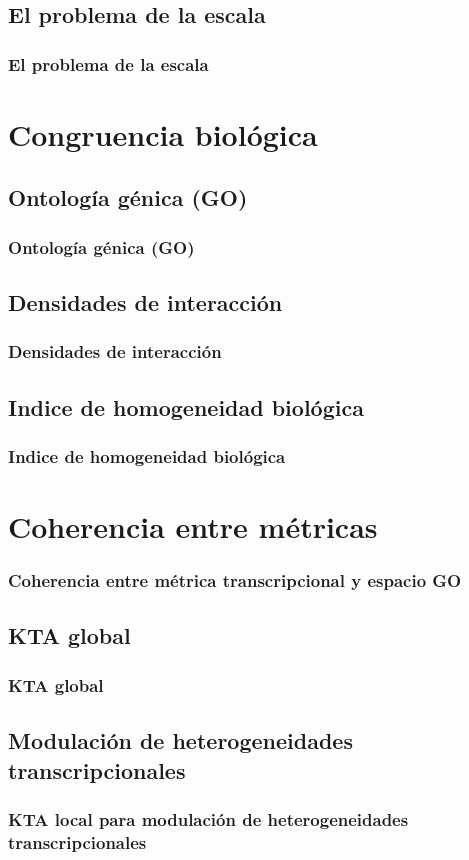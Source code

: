 \documentclass[serif,9pt, t]{beamer}
\begin{document}
\subsection{El problema de la escala}
\begin{frame}
\frametitle{El problema de la escala} 
\end{frame}

\section{Congruencia biológica}

\subsection{Ontología génica (GO)}
\begin{frame}
\frametitle{Ontología génica (GO)} 
\end{frame}

\subsection{Densidades de interacción}
\begin{frame}
\frametitle{Densidades de interacción} 
\end{frame}

\subsection{Indice de homogeneidad biológica}
\begin{frame}
\frametitle{Indice de homogeneidad biológica} 
\end{frame}

\section{Coherencia entre métricas}
\begin{frame}
\frametitle{Coherencia entre métrica transcripcional y espacio GO} 
\end{frame}

\subsection{KTA global}
\begin{frame}
\frametitle{KTA global} 
\end{frame}

\subsection{Modulación de heterogeneidades
transcripcionales}
\begin{frame}
\frametitle{KTA local para modulación de heterogeneidades transcripcionales} 
\end{frame}
\end{document}
